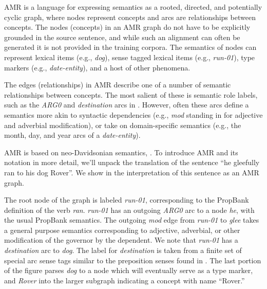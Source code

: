 \documentclass[11pt]{article}
\newcommand\w[1]{\textit{#1}} %
\newcommand\e[1]{\textit{#1}} %
\newcommand\n[1]{\textit{#1}} %
\begin{document}
AMR is a language for expressing semantics as a rooted, directed, and potentially cyclic graph, where nodes represent concepts and arcs are relationships between concepts.
The nodes (concepts) in an AMR graph do not have to be explicitly grounded in the source sentence, and while such an alignment can often be generated it is not provided in the training corpora.
The semantics of nodes can represent lexical items (e.g., \w{dog}), sense tagged lexical items (e.g., \textit{run-01}), type markers (e.g., \textit{date-entity}), and a host of other phenomena.

The edges (relationships) in AMR describe one of a number of semantic relationships between concepts.
The most salient of these is semantic role labels, such as the \w{ARG0} and \w{destination} arcs in .
However, often these arcs define a semantics more akin to syntactic dependencies (e.g., \textit{mod} standing in for adjective and adverbial modification), or take on domain-specific semantics (e.g., the month, day, and year arcs of a \textit{date-entity}).

AMR is based on neo-Davidsonian semantics, \cite{Davidson:1967,Parsons:1990}.
To introduce AMR and its notation in more detail, we'll unpack the translation of the sentence ``he gleefully ran to his dog Rover''. 
We show in  the interpretation of this sentence as an AMR graph.


The root node of the graph is labeled \n{run-01}, corresponding to the PropBank \cite{palmer2005proposition-srl} definition of the verb \w{ran}.
\w{run-01} has an outgoing \e{ARG0} arc to a node \w{he}, with the usual PropBank semantics.
The outgoing \e{mod} edge from \n{run-01} to \n{glee} takes a general purpose semantics corresponding to adjective, adverbial, or other modification of the governor by the dependent.
We note that \n{run-01} has a \e{destination} arc to \n{dog}.
The label for \e{destination} is taken from a finite set of special arc sense tags similar to the preposition senses found in \cite{srikumar2013-srl}.
The last portion of the figure parses \w{dog} to a node which will eventually serve as a type marker, and \w{Rover} into the larger subgraph indicating a concept with name ``Rover.''
\end{document}
